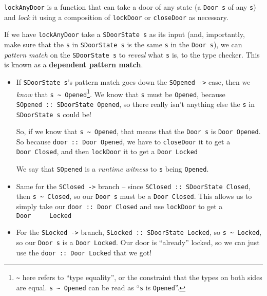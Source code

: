 \documentclass[]{article}
\begin{document}
\texttt{lockAnyDoor} is a function that can take a door of any state (a
\texttt{Door\ s} of any \texttt{s}) and \emph{lock} it using a composition of
\texttt{lockDoor} or \texttt{closeDoor} as necessary.

If we have \texttt{lockAnyDoor} take a \texttt{SDoorState\ s} as its input (and,
importantly, make sure that the \texttt{s} in \texttt{SDoorState\ s} is the same
\texttt{s} in the \texttt{Door\ s}), we can \emph{pattern match} on the
\texttt{SDoorState\ s} to \emph{reveal} what \texttt{s} is, to the type checker.
This is known as a \textbf{dependent pattern match}.

\begin{itemize}
\item
  If \texttt{SDoorState\ s}'s pattern match goes down the
  \texttt{SOpened\ -\textgreater{}} case, then we \emph{know} that
  \texttt{s\ \textasciitilde{}\ \textquotesingle{}Opened}\footnote{\texttt{\textasciitilde{}}
    here refers to ``type equality'', or the constraint that the types on both
    sides are equal. \texttt{s\ \textasciitilde{}\ \textquotesingle{}Opened} can
    be read as ``\texttt{s} is \texttt{\textquotesingle{}Opened}''.}. We know
  that \texttt{s} must be \texttt{\textquotesingle{}Opened}, because
  \texttt{SOpened\ ::\ SDoorState\ \textquotesingle{}Opened}, so there really
  isn't anything else the \texttt{s} in \texttt{SDoorState\ s} could be!

  So, if we know that \texttt{s\ \textasciitilde{}\ \textquotesingle{}Opened},
  that means that the \texttt{Door\ s} is
  \texttt{Door\ \textquotesingle{}Opened}. So because
  \texttt{door\ ::\ Door\textquotesingle{}\ Opened}, we have to
  \texttt{closeDoor} it to get a \texttt{Door\textquotesingle{}\ Closed}, and
  then \texttt{lockDoor} it to get a \texttt{Door\ \textquotesingle{}Locked}

  We say that \texttt{SOpened} is a \emph{runtime witness} to \texttt{s} being
  \texttt{\textquotesingle{}Opened}.
\item
  Same for the \texttt{SClosed\ -\textgreater{}} branch -- since
  \texttt{SClosed\ ::\ SDoorState\ \textquotesingle{}Closed}, then
  \texttt{s\ \textasciitilde{}\ \textquotesingle{}Closed}, so our
  \texttt{Door\ s} must be a \texttt{Door\ \textquotesingle{}Closed}. This
  allows us to simply take our \texttt{door\ ::\ Door\ \textquotesingle{}Closed}
  and use \texttt{lockDoor} to get a
  \texttt{Door\ \ \ \ \ \textquotesingle{}Locked}
\item
  For the \texttt{SLocked\ -\textgreater{}} branch,
  \texttt{SLocked\ ::\ SDoorState\ \textquotesingle{}Locked}, so
  \texttt{s\ \textasciitilde{}\ \textquotesingle{}Locked}, so our
  \texttt{Door\ s} is a \texttt{Door\ \textquotesingle{}Locked}. Our door is
  ``already'' locked, so we can just use the
  \texttt{door\ ::\ Door\ \textquotesingle{}Locked} that we got!
\end{itemize}
\end{document}

